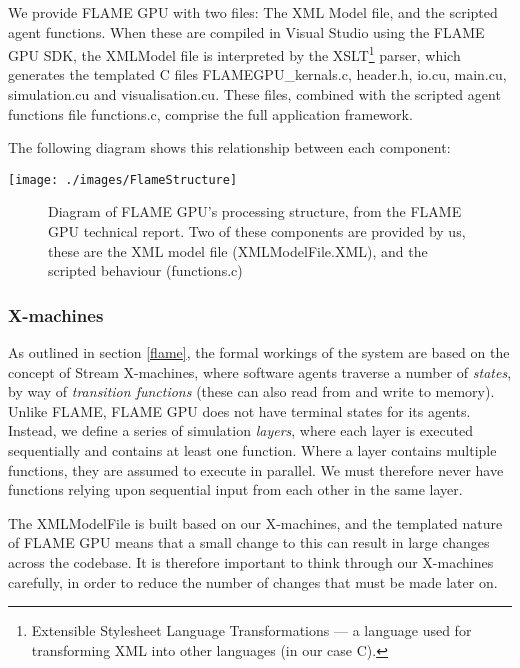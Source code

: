 \documentclass[11pt,a4paper]{article}
\begin{document}
We provide FLAME GPU with two files: The XML Model file, and the scripted agent functions. When these are compiled in Visual Studio using the FLAME GPU SDK, the XMLModel file is interpreted by the XSLT\footnote{Extensible Stylesheet Language Transformations --- a language used for transforming XML into other languages (in our case C).} parser, which generates the templated C files FLAMEGPU\_kernals.c, header.h, io.cu, main.cu, simulation.cu and visualisation.cu. These files, combined with the scripted agent functions file functions.c, comprise the full application framework.

The following diagram shows this relationship between each component:

\texttt{[image: ./images/FlameStructure]}
\begin{figure}[h!]
\centering
\caption [FLAME GPU Structure]{Diagram of FLAME GPU's processing structure, from the FLAME GPU technical report\cite{fgpuTechnical}. Two of these components are provided by us, these are the XML model file (XMLModelFile.XML), and the scripted behaviour (functions.c)}
\end{figure}

\subsubsection{X-machines}
\label{xMachines}
As outlined in section \ref{flame}, the formal workings of the system are based on the concept of Stream X-machines, where software agents traverse a number of \emph{states}, by way of \emph{transition functions} (these can also read from and write to memory). Unlike FLAME, FLAME GPU does not have terminal states for its agents. Instead, we define a series of simulation \emph{layers}, where each layer is executed sequentially and contains at least one function. Where a layer contains multiple functions, they are assumed to execute in parallel. We must therefore never have functions relying upon sequential input from each other in the same layer.

The XMLModelFile is built based on our X-machines, and the templated nature of FLAME GPU means that a small change to this can result in large changes across the codebase. It is therefore important to think through our X-machines carefully, in order to reduce the number of changes that must be made later on.
\end{document}
